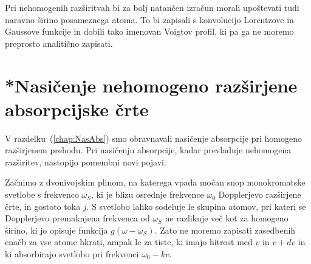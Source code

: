 \begin{remark}
Pri nehomogenih razširitvah bi za bolj natančen izračun morali upoštevati 
tudi naravno širino posameznega atoma. To bi zapisali s konvolucijo Lorentzove
in Gaussove funkcije in dobili tako imenovan Voigtov 
profil, ki pa ga ne moremo 
preprosto analitično zapisati.
\end{remark}

\section{*Nasičenje nehomogeno razširjene absorpcijske črte}
\label{NasabsNehom}
V razdelku~(\ref{chap:NasAbs}) smo obravnavali nasičenje absorpcije pri homogeno 
razširjenem prehodu. Pri nasičenju absorpcije, kadar prevladuje nehomogena razširitev,
nastopijo pomembni novi pojavi.

Začnimo z dvonivojskim plinom, na katerega 
vpada močan snop monokromatske svetlobe s frekvenco $\omega_S$,
ki je blizu osrednje frekvence $\omega_{0}$ Dopplerjevo razširjene 
črte, in gostoto toka $j$. S svetlobo
lahko sodeluje le skupina atomov, pri kateri se Dopplerjevo premaknjena
frekvenca od $\omega_S$ ne razlikuje več kot za homogeno širino, ki
jo opisuje funkcija $g(\omega-\omega_S)$. Zato ne moremo zapisati zasedbenih
enačb za vse atome hkrati, ampak le za tiste, ki imajo hitrost med
$v$ in $v+dv$ in ki absorbirajo svetlobo pri frekvenci $\omega_{0}-kv$.

